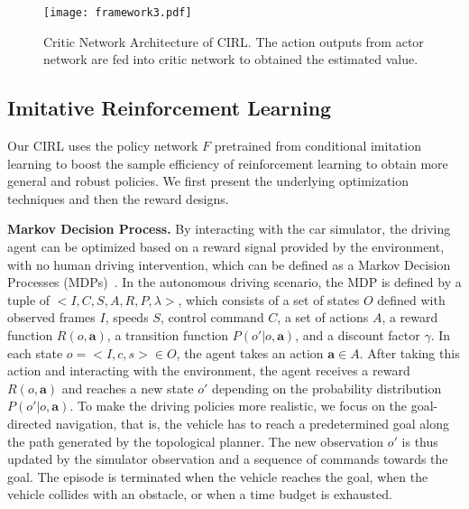 \documentclass[runningheads]{llncs}
\begin{document}
\begin{figure*}[!tp]
        \begin{center}
     \texttt{[image: framework3.pdf]}\vspace{-3mm}
            \caption{Critic Network Architecture of CIRL. The action outputs from actor network are fed into critic network to obtained the estimated value.}\vspace{-5mm}
            \label{fig:critic}
        \end{center}
    \end{figure*}
    
\subsection{Imitative Reinforcement Learning}

Our CIRL uses the policy network $F$ pretrained from conditional imitation learning to boost the sample efficiency of reinforcement learning to obtain more general and robust policies. We first present the underlying optimization techniques and then the reward designs.

\noindent\textbf{Markov Decision Process.} By interacting with the car simulator, the driving agent can be optimized based on a reward signal provided by the environment, with no human driving intervention, which can be defined as a Markov Decision Processes (MDPs)~\cite{sutton1998introduction}. In the autonomous driving scenario, the MDP is defined by a tuple of $<I,C,S,A,R,P, \lambda>$, which consists of a set of states $O$ defined with observed frames $I$, speeds $S$, control command $C$, a set of actions $A$, a reward function $R(o,\mathbf{a})$, a transition function
$P(o'|o, \mathbf{a})$, and a discount factor $\gamma$. In each state $o = <I, c, s>\in O$, the agent takes an action $\mathbf{a}\in A$. After taking this action and interacting with the environment, the agent receives a reward $R(o,\mathbf{a})$ and reaches a new state $o'$ depending on the probability distribution $P(o'|o, \mathbf{a})$. To make the driving policies more realistic, we focus on the goal-directed navigation, that is, the vehicle has to reach a predetermined goal along the path generated by the topological planner. The new observation $o'$ is thus updated by the simulator observation and a sequence of commands towards the goal. The episode is terminated when the vehicle reaches the goal, when the vehicle collides with an obstacle, or when a time budget is exhausted.
\end{document}
